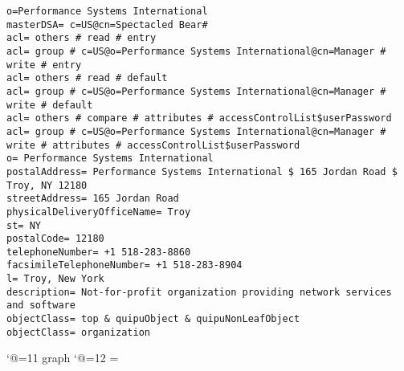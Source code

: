 
\tiny
\begin{verbatim}
o=Performance Systems International
masterDSA= c=US@cn=Spectacled Bear#
acl= others # read # entry
acl= group # c=US@o=Performance Systems International@cn=Manager # write # entry
acl= others # read # default
acl= group # c=US@o=Performance Systems International@cn=Manager # write # default
acl= others # compare # attributes # accessControlList$userPassword
acl= group # c=US@o=Performance Systems International@cn=Manager # write # attributes # accessControlList$userPassword
o= Performance Systems International
postalAddress= Performance Systems International $ 165 Jordan Road $ Troy, NY 12180
streetAddress= 165 Jordan Road
physicalDeliveryOfficeName= Troy
st= NY
postalCode= 12180
telephoneNumber= +1 518-283-8860
facsimileTelephoneNumber= +1 518-283-8904
l= Troy, New York
description= Not-for-profit organization providing network services and software
objectClass= top & quipuObject & quipuNonLeafObject
objectClass= organization

\end{verbatim}

\catcode`@=11
\expandafter\ifx\csname graph\endcsname\relax {}\box\chardef\insc@unt\graph\fi
\catcode`@=12
\setbox\graph=\empty
